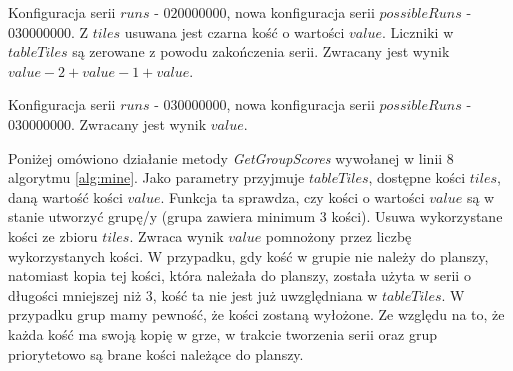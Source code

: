 \begin{example}
Konfiguracja serii $runs$ - $020000000$, nowa konfiguracja serii $possibleRuns$ - $030000000$.
Z $tiles$ usuwana jest czarna kość o wartości $value$. Liczniki w $tableTiles$ są zerowane z powodu zakończenia serii. Zwracany jest wynik $value-2 + value-1 + value$. \end{example}

\begin{example}
Konfiguracja serii $runs$ - $030000000$, nowa konfiguracja serii $possibleRuns$ - $030000000$.
Zwracany jest wynik $value$. 
\end{example}

Poniżej omówiono działanie metody \emph{GetGroupScores} wywołanej w linii 8 algorytmu \ref{alg:mine}.
Jako parametry przyjmuje $tableTiles$, dostępne kości $tiles$, daną wartość kości $value$.  
Funkcja ta sprawdza, czy kości o wartości $value$ są w stanie utworzyć grupę/y (grupa zawiera minimum $3$ kości). Usuwa wykorzystane kości ze zbioru $tiles$. Zwraca wynik $value$ pomnożony przez liczbę wykorzystanych kości. W przypadku, gdy kość w grupie nie należy do planszy, natomiast kopia tej kości, która należała do planszy, została użyta w serii o długości mniejszej niż $3$, kość ta nie jest już uwzględniana w $tableTiles$. W przypadku grup mamy pewność, że kości zostaną wyłożone. Ze względu na to, że każda kość ma swoją kopię w grze, w trakcie tworzenia serii oraz grup priorytetowo są brane kości należące do planszy. 




